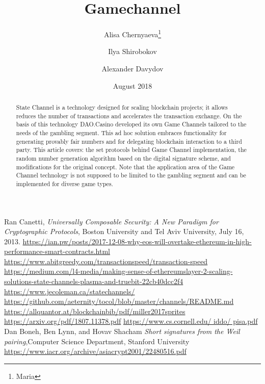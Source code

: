 \documentclass[tikz, 12pt]{article}
\title {Gamechannel}
\author {Alisa Chernyaeva\thanks{Maria}}
\author{Ilya Shirobokov\samethanks}
\author{  Alexander Davydov\samethanks}
\affil{Research department, DAO.Casino Company}
\affil{ \href{mailto:Research@Dao.casino}{Research@Dao.casino}}
\date {August 2018}
\theoremstyle{definition}
\theoremstyle{remark}
\begin{document}
\maketitle
	\begin{abstract}
State Channel is a technology designed for scaling blockchain projects; it allows reduces the number of transactions and accelerates the transaction exchange. On the basis of this technology DAO.Casino developed its own Game Channels tailored to the needs of the gambling segment. This ad hoc solution embraces functionality for generating provably fair numbers and for delegating blockchain interaction to a third party. This article covers: the set protocols behind Game Channel implementation, the random number generation algorithm based on the digital signature scheme, and modifications for the original concept. Note that the application area of the Game Channel technology is not supposed to be limited to the gambling segment and can be implemented for diverse game types.

	\end{abstract}
\tableofcontents	
	
	
		


	\begin{thebibliography}{9}
Ran Canetti, \emph{Universally Composable Security: A New Paradigm for Cryptographic Protocols}, Boston University and Tel Aviv University, July 16, 2013.
 \url{https://ian.pw/posts/2017-12-08-why-eos-will-overtake-ethereum-in-high-performance-smart-contracts.html}
 \url{https://www.abitgreedy.com/transactionspeed/transaction-speed}
 \url{https://medium.com/l4-media/making-sense-of-ethereumslayer-2-scaling-solutions-state-channels-plasma-and-truebit-22cb40dcc2f4}
 \url{https://www.jecoleman.ca/statechannels/}
 \url{https://github.com/aeternity/tocol/blob/master/channels/README.md}
 \url{https://allquantor.at/blockchainbib/pdf/miller2017sprites}
 \url{https://arxiv.org/pdf/1807.11378.pdf}
 \url{https://www.cs.cornell.edu/ iddo/ pisa.pdf}
Dan Boneh, Ben Lynn, and Hovav Shacham \emph{Short signatures from the Weil pairing},Computer Science Department, Stanford University \url{https://www.iacr.org/archive/asiacrypt2001/22480516.pdf}
\end{thebibliography}


		
\end{document}
